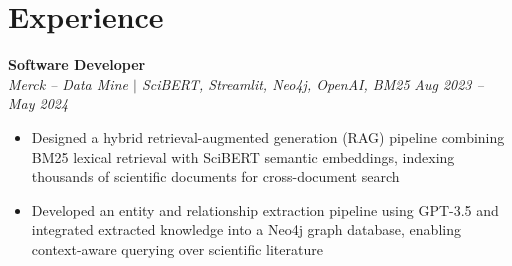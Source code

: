 \documentclass[10pt,letterpaper]{article}
\newcommand{\heading}[4]{%
  \noindent\textbf{#1} \hfill #2\\
  \textit{#3} \hfill \textit{#4}\par
}
\begin{document}
\section{Experience}



\heading{Software Developer}{}{Merck -- Data Mine $|$ SciBERT, Streamlit, Neo4j, OpenAI, BM25}{Aug 2023 -- May 2024}
\begin{itemize}
  \item Designed a hybrid retrieval-augmented generation (RAG) pipeline combining BM25 lexical retrieval with SciBERT semantic embeddings, indexing thousands of scientific documents for cross-document search
  \item Developed an entity and relationship extraction pipeline using GPT-3.5 and integrated extracted knowledge into a Neo4j graph database, enabling context-aware querying over scientific literature
\end{itemize}



\end{document}
